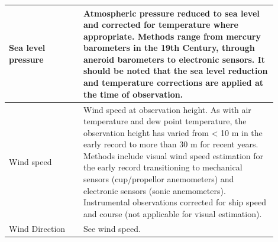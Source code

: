 \begin{table}[h]
\begin{tabular}{|p{0.25\linewidth}|p{0.65\linewidth}|}
\hline
Sea level pressure & Atmospheric pressure reduced to sea level and corrected for temperature where appropriate. Methods range from mercury barometers in the 19th Century, through aneroid barometers to electronic sensors. It should be noted that the sea level reduction and temperature corrections are applied at the time of observation.\\
\hline
Wind speed & Wind speed at observation height. As with air temperature and dew point temperature, the observation height has varied from < 10 m in the early record to more than 30 m for recent years. Methods include visual wind speed estimation for the early record transitioning to mechanical sensors (cup/propellor anemometers) and electronic sensors (sonic anemometers). Instrumental observations corrected for ship speed and course (not applicable for visual estimation).\\
\hline
Wind Direction & See wind speed.\\
\hline
\end{tabular}
\end{table}

